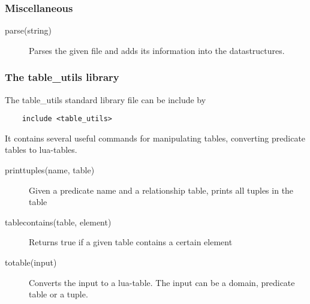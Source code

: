 \subsubsection{Miscellaneous}
\begin{description}
	
	
	\item[parse(string)]
 		Parses the given file and adds its information into the datastructures.

\end{description}


\subsubsection{The table\_utils library}
The table\_utils standard library file can be include by 
\begin{lstlisting}
	include <table_utils>
\end{lstlisting}
It contains several useful commands for manipulating tables, converting predicate tables to lua-tables.

\begin{description}
 \item[printtuples(name, table)]
	      Given a predicate name and a relationship table, prints all tuples in the table
 \item[tablecontains(table, element)]
	      Returns true if a given table contains a certain element
 \item[totable(input)]
	      Converts the input to a lua-table. The input can be a domain, predicate table or a tuple.
\end{description}



